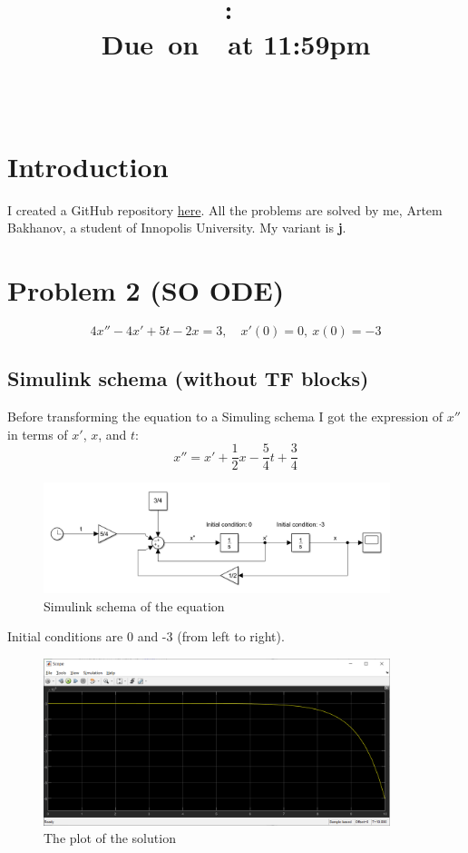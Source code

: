 \documentclass{article}
\title{
    \vspace{2in}
    \textmd{\textbf{\hmwkClass:\ \hmwkTitle}}\\
    \normalsize\vspace{0.1in}\small{Due\ on\ \hmwkDueDate\ at 11:59pm}\\
    \vspace{0.1in}\large{\textit{\hmwkClassInstructor\ }}
    \vspace{3in}
}
\author{\hmwkAuthorName}
\date{}
\begin{document}
\maketitle

\pagebreak

\tableofcontents

\pagebreak

\section{Introduction}
    I created a GitHub repository \href{https://github.com/artembakhanov/ControlTheoryHomework}{here}.
    All the problems are solved by me, Artem Bakhanov, a student of Innopolis University. My variant is \textbf{j}.
    
\section{Problem 2 (SO ODE)}
    \begin{equation}
        4x'' - 4x' + 5t - 2x = 3, \quad x'(0) = 0, \ x(0) = -3
    \end{equation}
    \subsection{Simulink schema (without TF blocks)}
    Before transforming the equation to a Simuling schema I got the expression of $x''$ in terms of $x'$, $x$, and $t$:
    \begin{equation}
        x'' = x' + \frac{1}{2} x  - \frac{5}{4} t + \frac{3}{4} 
    \end{equation}
    \begin{figure}[ht]
        \centering
        \includegraphics[width=0.9\textwidth]{images/schema2A_j.png}
        \caption{Simulink schema of the equation}
        \label{fig:simulink2}
    \end{figure}
    Initial conditions are 0 and -3 (from left to right).
    \begin{figure}[ht]
        \centering
        \includegraphics[width=0.9\textwidth]{images/plot2A_j.png}
        \caption{The plot of the solution}
        \label{fig:plot2a}
    \end{figure}
    
\end{document}

